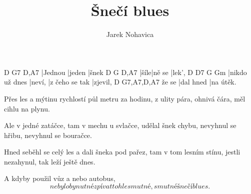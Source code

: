\documentclass{song}
\title{Šnečí blues}
\author{Jarek Nohavica}
\begin{document}
\strophe
D       G7     D,A7
|Jednou |jeden |šnek
D    G      D,A7
|šíle|ně se |lek',
D              D7     G              Gm
|nikdo už dnes |neví, |z čeho se tak |zjevil,
      D         G7,A7,D,A7
že se |dal hned |na útěk.
\endstrophe

\strophe*
Přes les a mýtinu
rychlostí půl metru za hodinu,
z ulity pára, ohnivá čára,
měl cihlu na plynu.
\endstrophe

\strophe*
Ale v jedné zatáčce,
tam v mechu u svlačce,
udělal šnek chybu, nevyhnul se hřibu,
nevyhnul se bouračce.
\endstrophe

\strophe*
Hned seběhl se celý les
a dali šneka pod pařez,
tam v tom lesním stínu, jestli nezahynul,
tak leží ještě dnes.
\endstrophe

\strophe*
A kdyby použil vůz
a nebo autobus,
\[ nebylo by nutné zpívat tohle smutné,
smutné šnečí blues. \]
\endstrophe
\end{document}
